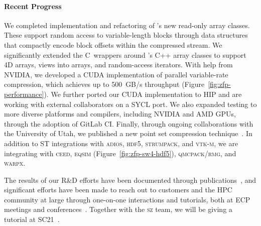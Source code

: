 \paragraph{Recent Progress}

We completed implementation and refactoring of \zfp's new read-only array classes.
These support random access to variable-length blocks through data structures that compactly encode block offsets within the compressed stream.
We significantly extended the C~wrappers around \zfp's C++ array classes to support 4D arrays, views into arrays, and random-access iterators.
With help from NVIDIA, we developed a CUDA implementation of parallel variable-rate compression, which achieves up to 500~GB/s throughput (Figure~\ref{fig:zfp-performance}).
We further ported our CUDA implementation to HIP and are working with external collaborators on a SYCL port.
We also expanded {\zfp} testing to more diverse platforms and compilers, including NVIDIA and AMD GPUs, through the adoption of GitLab CI.
Finally, through ongoing collaborations with the University of Utah, we published a new point set compression technique~\cite{zfp-ldav2021}.
In addition to ST integrations with \textsc{adios}, \textsc{hdf5}, \textsc{strumpack}, and \textsc{vtk-m}, we are integrating {\zfp} with \textsc{ceed}, \textsc{eqsim} (Figure~\ref{fig:zfp-sw4-hdf5}), \textsc{qmcpack}/\textsc{rmg}, and \textsc{warpx}.

The results of our R\&D efforts have been documented through publications~\cite{zfp-isc2017,zfp-jsm2017,zfp-sisc2019,zfp-drbsd2019,zfp-pdp2020,zfp-vis2020,zfp-ldav2021}, and significant efforts have been made to reach out to customers and the HPC community at large through one-on-one interactions and tutorials, both at ECP meetings and conferences~\cite{zfp-isc2017-tut,zfp-sc2017-tut,zfp-ep2018-tut,zfp-sc2018-tut,zfp-isc2019-tut,zfp-sc2019-tut,zfp-sc2020-tut,zfp-sc2020-pan}.  Together with the \textsc{sz} team, we will be giving a tutorial at SC21~\cite{zfp-sc2021-tut}.

